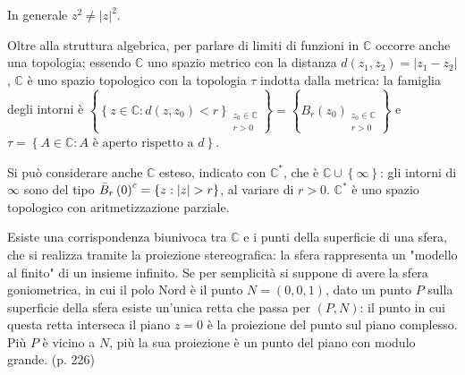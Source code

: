 \documentclass{article}
\begin{document}
In generale $z^{2}\neq \left\vert z\right\vert ^{2}$.

Oltre alla struttura algebrica, per parlare di limiti di funzioni in $%
\mathbb{C}
$ occorre anche una topologia; essendo $%
\mathbb{C}
$ uno spazio metrico con la distanza $d\left( z_{1},z_{2}\right) =\left\vert
z_{1}-z_{2}\right\vert $, $%
\mathbb{C}
$ \`{e} uno spazio topologico con la topologia $\tau $ indotta dalla
metrica: la famiglia degli intorni \`{e} $\left\{ \left\{ z\in 
\mathbb{C}
:d\left( z,z_{0}\right) <r\right\} _{\substack{ z_{0}\in 
\mathbb{C}
\\ r>0}}\right\} =\left\{ B_{r}\left( z_{0}\right) _{\substack{ z_{0}\in 
\mathbb{C}
\\ r>0}}\right\} $ e $\tau =\left\{ A\in 
\mathbb{C}
:A\text{ \`{e} aperto rispetto a }d\right\} $.

Si pu\`{o} considerare anche $%
\mathbb{C}
$ esteso, indicato con $%
\mathbb{C}
^{\ast }$, che \`{e} $%
\mathbb{C}
\cup \left\{ \infty \right\} $: gli intorni di $\infty $ sono del tipo $\bar{%
B}_{r}\left( 0\right) ^{c}=\left\{ z:\left\vert z\right\vert >r\right\} $,
al variare di $r>0$. $%
\mathbb{C}
^{\ast }$ \`{e} uno spazio topologico con aritmetizzazione parziale.

Esiste una corrispondenza biunivoca tra $%
\mathbb{C}
$ e i punti della superficie di una sfera, che si realizza tramite la
proiezione stereografica: la sfera rappresenta un "modello al finito" di un
insieme infinito. Se per semplicit\`{a} si suppone di avere la sfera
goniometrica, in cui il polo Nord \`{e} il punto $N=\left( 0,0,1\right) $,
dato un punto $P$ sulla superficie della sfera esiste un'unica retta che
passa per $\left( P,N\right) $: il punto in cui questa retta interseca il
piano $z=0$ \`{e} la proiezione del punto sul piano complesso. Pi\`{u} $P$ 
\`{e} vicino a $N$, pi\`{u} la sua proiezione \`{e} un punto del piano con
modulo grande. (p. 226)
\end{document}
